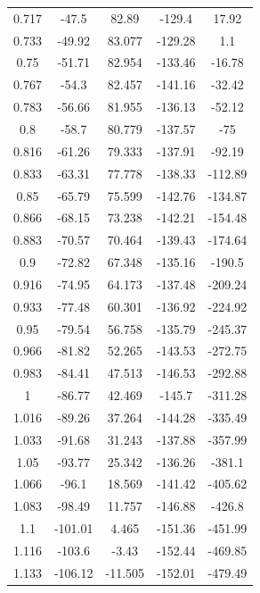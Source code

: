 \documentclass[12pt,a4paper]{article}
\begin{document}
\begin{longtable}[h]{| c | c | c | c | c |}
0.717 & -47.5   & 82.89   & -129.4  & 17.92   \\
0.733 & -49.92  & 83.077  & -129.28 & 1.1     \\
0.75  & -51.71  & 82.954  & -133.46 & -16.78  \\
0.767 & -54.3   & 82.457  & -141.16 & -32.42  \\
0.783 & -56.66  & 81.955  & -136.13 & -52.12  \\
0.8   & -58.7   & 80.779  & -137.57 & -75     \\
0.816 & -61.26  & 79.333  & -137.91 & -92.19  \\
0.833 & -63.31  & 77.778  & -138.33 & -112.89 \\
0.85  & -65.79  & 75.599  & -142.76 & -134.87 \\
0.866 & -68.15  & 73.238  & -142.21 & -154.48 \\
0.883 & -70.57  & 70.464  & -139.43 & -174.64 \\
0.9   & -72.82  & 67.348  & -135.16 & -190.5  \\
0.916 & -74.95  & 64.173  & -137.48 & -209.24 \\
0.933 & -77.48  & 60.301  & -136.92 & -224.92 \\
0.95  & -79.54  & 56.758  & -135.79 & -245.37 \\
0.966 & -81.82  & 52.265  & -143.53 & -272.75 \\
0.983 & -84.41  & 47.513  & -146.53 & -292.88 \\
1     & -86.77  & 42.469  & -145.7  & -311.28 \\
1.016 & -89.26  & 37.264  & -144.28 & -335.49 \\
1.033 & -91.68  & 31.243  & -137.88 & -357.99 \\
1.05  & -93.77  & 25.342  & -136.26 & -381.1  \\
1.066 & -96.1   & 18.569  & -141.42 & -405.62 \\
1.083 & -98.49  & 11.757  & -146.88 & -426.8  \\
1.1   & -101.01 & 4.465   & -151.36 & -451.99 \\
1.116 & -103.6  & -3.43   & -152.44 & -469.85 \\
1.133 & -106.12 & -11.505 & -152.01 & -479.49
\label{raw data table}
\end{longtable}
\end{document}
